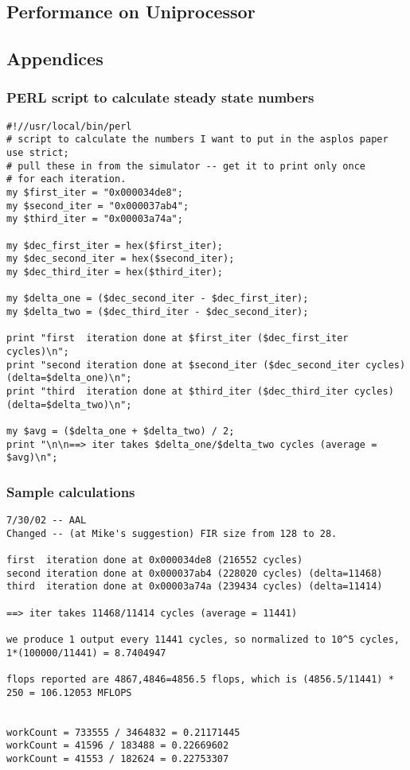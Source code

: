 \subsection{Performance on Uniprocessor}

\subsection{Appendices}
\subsubsection{PERL script to calculate steady state numbers}
\begin{verbatim}
#!//usr/local/bin/perl
# script to calculate the numbers I want to put in the asplos paper
use strict;
# pull these in from the simulator -- get it to print only once
# for each iteration.
my $first_iter = "0x000034de8";
my $second_iter = "0x000037ab4";
my $third_iter = "0x00003a74a";

my $dec_first_iter = hex($first_iter);
my $dec_second_iter = hex($second_iter);
my $dec_third_iter = hex($third_iter);

my $delta_one = ($dec_second_iter - $dec_first_iter);
my $delta_two = ($dec_third_iter - $dec_second_iter);

print "first  iteration done at $first_iter ($dec_first_iter cycles)\n";
print "second iteration done at $second_iter ($dec_second_iter cycles) (delta=$delta_one)\n";
print "third  iteration done at $third_iter ($dec_third_iter cycles) (delta=$delta_two)\n";

my $avg = ($delta_one + $delta_two) / 2;
print "\n\n==> iter takes $delta_one/$delta_two cycles (average = $avg)\n";
\end{verbatim}




\subsubsection{Sample calculations}
\begin{verbatim}
7/30/02 -- AAL 
Changed -- (at Mike's suggestion) FIR size from 128 to 28.

first  iteration done at 0x000034de8 (216552 cycles)
second iteration done at 0x000037ab4 (228020 cycles) (delta=11468)
third  iteration done at 0x00003a74a (239434 cycles) (delta=11414)

==> iter takes 11468/11414 cycles (average = 11441)

we produce 1 output every 11441 cycles, so normalized to 10^5 cycles, 1*(100000/11441) = 8.7404947

flops reported are 4867,4846=4856.5 flops, which is (4856.5/11441) * 250 = 106.12053 MFLOPS


workCount = 733555 / 3464832 = 0.21171445
workCount = 41596 / 183488 = 0.22669602
workCount = 41553 / 182624 = 0.22753307
\end{verbatim}

